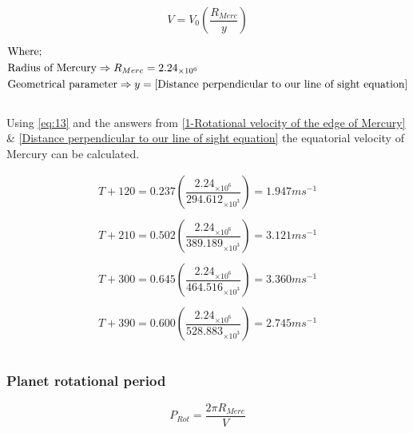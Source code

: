 \documentclass[11pt]{article}
\begin{document}
\begin{multicols}{2}
\begin{equation} \label{eq:13}
{V = V_{0} \left(\dfrac{R_{Merc}}{y}\right)}
\end{equation}

\begin{equation*}
\begin{split}
&\text{Where;} \\
&\text{Radius of Mercury} \Rightarrow {R_{Merc}}=2.24_{\times10^6} \\
&\text{Geometrical parameter} \Rightarrow y = \cref{Distance perpendicular to our line of sight equation} \\
\end{split}
\end{equation*} \\

Using \cref{eq:13} and the answers from \cref{1-Rotational velocity of the edge of Mercury} \& \cref{Distance perpendicular to our line of sight equation} the equatorial velocity of Mercury can be calculated.

\begin{equation}\label{1-Equatorial velocity of Mercury}
\begin{split}
{T+120 = 0.237 \left(\dfrac{2.24_{\times10^6}}{294.612_{\times10^3}}\right)} = 1.947ms^{-1} \\
\\
{T+210 = 0.502 \left(\dfrac{2.24_{\times10^6}}{389.189_{\times10^3}}\right)} = 3.121ms^{-1} \\
\\
{T+300 = 0.645 \left(\dfrac{2.24_{\times10^6}}{464.516_{\times10^3}}\right)} = 3.360ms^{-1} \\
\\
{T+390 = 0.600 \left(\dfrac{2.24_{\times10^6}}{528.883_{\times10^3}}\right)} = 2.745ms^{-1} \\
\\
\end{split}
\end{equation}


\subsubsection{Planet rotational period}

\begin{equation} \label{eq:15}
{P_{Rot} =\dfrac{2 \pi R_{Merc}}{V}}
\end{equation}


\end{multicols}
\end{document}
